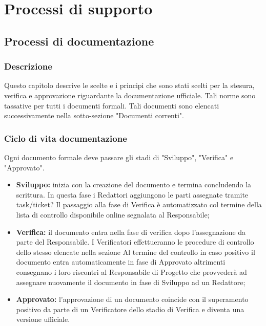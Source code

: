 \documentclass[NormeDiProgetto.tex]{subfiles}
\begin{document}
	
	\chapter{Processi di supporto}
	
	\section{Processi di documentazione}
	\subsection{Descrizione}
	Questo capitolo descrive le scelte e i principi che sono stati scelti per la
	stesura, verifica e approvazione riguardante la documentazione ufficiale.
	Tali norme sono tassative per tutti i documenti formali.
	Tali documenti sono elencati successivamente nella sotto-sezione "Documenti correnti". %
	
	\subsection{Ciclo di vita documentazione}
	Ogni documento formale deve passare gli stadi di "Sviluppo", "Verifica" e "Approvato".
	\begin{itemize}
		\item \textbf{Sviluppo:} inizia con la creazione del documento e termina concludendo la scrittura. In questa fase i Redattori aggiungono le parti assegnate tramite task/ticket? %
		Il passaggio alla fase di Verifica è automatizzato col termine della lista di controllo disponibile online segnalata al Responsabile;
		
		\item \textbf{Verifica:} il documento entra nella fase di verifica dopo l'assegnazione da parte del Responsabile.
		I Verificatori effettueranno le procedure di controllo dello stesso elencate nella sezione %
		Al termine del controllo in caso positivo il documento entra automaticamente in fase di Approvato altrimenti consegnano i loro riscontri al Responsabile di Progetto che provvederà ad assegnare nuovamente il documento in fase di Sviluppo ad un Redattore;
		
		\item \textbf{Approvato:} l'approvazione di un documento coincide con il superamento positivo da parte di un Verificatore dello stadio di Verifica e diventa una versione ufficiale.
	\end{itemize}
	
\end{document}
